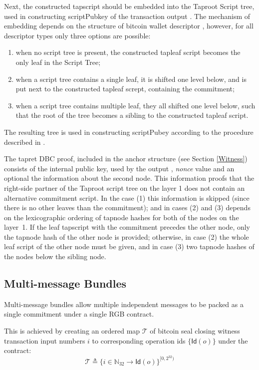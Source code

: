 \documentclass[9pt,oneside]{amsart}
\begin{document}
\begin{multicols}{2}
Next, the constructed tapscript should be embedded into the Taproot Script tree,
used in constructing \textsf{scriptPubkey} of the transaction output \cite{BIP341}.
The mechanism of embedding depends on the structure of bitcoin wallet descriptor \cite{BIP380},
however, for all descriptor types only three options are possible:
\noindent
\begin{enumerate}
\item when no script tree is present,
    the constructed tapleaf script becomes the only leaf in the Script Tree;
\item when a script tree contains a single leaf, it is shifted one level below,
    and is put next to the constructed tapleaf scrept, containing the commitment;
\item when a script tree contains multiple leaf, they all shifted one level below,
    such that the root of the tree becomes a sibling to the constructed tapleaf script.
\end{enumerate}
\noindent
The resulting tree is used in constructing \textsf{scriptPubey}
according to the procedure described in \cite{BIP341}.

The tapret DBC proof, included in the anchor structure (see Section \ref{Witness})
consists of the internal public key, used by the output \cite{BIP341},
\emph{nonce} value and an optional the information about the second node.
This information proofs that the right-side partner of the Taproot script tree on the layer 1
does not contain an alternative  commitment script.
In the case (1) this information is skipped (since there is no other leaves than the commitment);
and in cases (2) and (3) depends on the lexicographic ordering
of tapnode hashes \cite{BIP341} for both of the nodes on the layer~1.
If the leaf tapscript with the commitment precedes the other node,
only the tapnode hash of the other node is provided;
otherwise, in case (2) the whole leaf script of the other node must be given,
and in case (3) two tapnode hashes of the nodes below the sibling node.


\subsection{Multi-message Bundles}\label{MMB}

Multi-message bundles allow multiple independent messages
to be packed as a single commitment under a single RGB contract.

This is achieved by creating an ordered map $\mathcal{T}$ of
bitcoin seal closing witness transaction input numbers $i$
to corresponding operation ids $\{ \mathsf{Id}(o) \}$ under the contract:
\noindent
\begin{equation}
    \mathcal{T} \triangleq \{ i \in \mathbb{N}_{32} \rightarrow \mathsf{Id}(o) \}^{[0, 2^{32})}
\end{equation}


\end{multicols}
\end{document}
